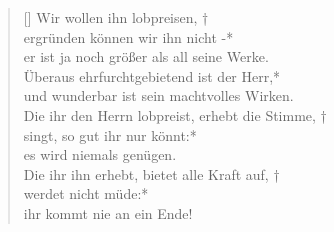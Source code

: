 \begin{verse}[\versewidth]
\vin Wir wollen ihn lobpreisen, †\\
\vin ergründen können wir ihn nicht -*\\
\vin er ist ja noch größer als all seine Werke.\\
Überaus ehrfurchtgebietend ist der Herr,*\\
und wunderbar ist sein machtvolles Wirken.\\
\vin Die ihr den Herrn lobpreist, erhebt die Stimme, †\\
\vin singt, so gut ihr nur könnt:*\\
\vin es wird niemals genügen.\\
Die ihr ihn erhebt, bietet alle Kraft auf, †\\
werdet nicht müde:*\\
ihr kommt nie an ein Ende!\\
 
\end{verse}

\vspace{0.6cm}

